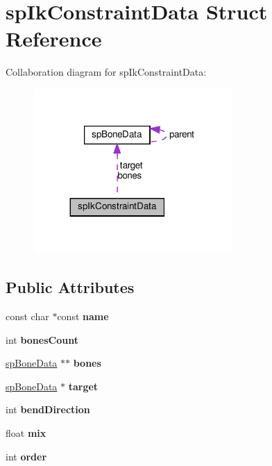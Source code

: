 \hypertarget{structspIkConstraintData}{}\section{sp\+Ik\+Constraint\+Data Struct Reference}
\label{structspIkConstraintData}


Collaboration diagram for sp\+Ik\+Constraint\+Data\+:
\nopagebreak
\begin{figure}[H]
\begin{center}
\leavevmode
\includegraphics[width=215pt]{structspIkConstraintData__coll__graph}
\end{center}
\end{figure}
\subsection*{Public Attributes}
\begin{DoxyCompactItemize}
\item 
\mbox{\label{structspIkConstraintData_a9d31933f175ee847a78413ac1424592d}} 
const char $\ast$const {\bfseries name}
\item 
\mbox{\label{structspIkConstraintData_a616405fb210460753895426aae196acc}} 
int {\bfseries bones\+Count}
\item 
\mbox{\label{structspIkConstraintData_a94548f26470c14bb47d5cdb3b079df74}} 
\hyperlink{structspBoneData}{sp\+Bone\+Data} $\ast$$\ast$ {\bfseries bones}
\item 
\mbox{\label{structspIkConstraintData_a89909eea674ab4347da40a6ec09c6999}} 
\hyperlink{structspBoneData}{sp\+Bone\+Data} $\ast$ {\bfseries target}
\item 
\mbox{\label{structspIkConstraintData_af59dbb63c741b2c14fac654387ae54fa}} 
int {\bfseries bend\+Direction}
\item 
\mbox{\label{structspIkConstraintData_a6fab434aad0fd9533c08809b656ab95c}} 
float {\bfseries mix}
\item 
\mbox{\label{structspIkConstraintData_a7df63e8839144104814b19a5210fd994}} 
int {\bfseries order}
\end{DoxyCompactItemize}


